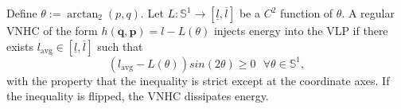 \begin{thm}\label{thm:vlp-energy-stabilization}
   Define \(\theta := \arctan_2(p,q)\).
   Let \(L : \mathbb{S}^1 \rightarrow [\underline{l},\overline{l}]\) be a
   \(C^2\) function of \(\theta\).
   A regular VNHC of the form 
   \(h(\mathbf{q},\mathbf{p}) = l - L(\theta)\) injects energy into the VLP
   if there exists 
   \(l_\text{avg} \in [\underline{l},\overline{l}]\) such that 
   \begin{equation}\label{eqn:vlp-energy-gain-condition}
      \left(l_\text{avg} - L(\theta)\right)sin(2\theta) \geq 0 
      \text{ }\forall \theta \in \mathbb{S}^1
      ,
   \end{equation}
   with the property that the inequality is strict except at the
   coordinate axes.
   If the inequality is flipped, the VNHC dissipates energy. 
\end{thm}
